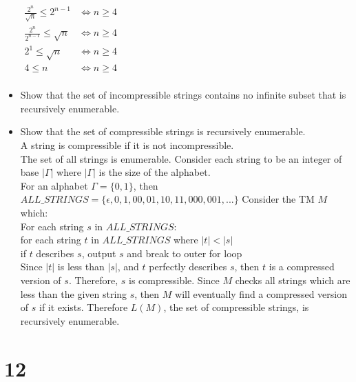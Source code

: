 \documentclass[letterpaper,notitlepage,twoside]{article}
\renewcommand{\iff}{\Leftrightarrow} %
\newcommand\tab[1][1cm]{\hspace*{#1}} %
\begin{document}
\begin{itemize}
$\begin{aligned}
\frac{2^n}{\sqrt{n}} \leq 2^{n - 1} &\iff n \geq 4 \\
\frac{2^n}{2^{n - 1}} \leq \sqrt{n} &\iff n \geq 4 \\
2^1 \leq \sqrt{n} &\iff n \geq 4 \\
4 \leq n &\iff n \geq 4 \\
\end{aligned}$

\item Show that the set of incompressible strings contains no infinite subset that is recursively enumerable.

\item Show that the set of compressible strings is recursively enumerable.\\
A string is compressible if it is not incompressible.\\
The set of all strings is enumerable. Consider each string to be an integer of base $|\Gamma|$ where $|\Gamma|$ is the size of the alphabet. \\
For an alphabet $\Gamma = \{0, 1\}$, then $ALL\_STRINGS = \{\epsilon, 0, 1, 00, 01, 10, 11, 000, 001,...\}$
Consider the TM $M$ which: \\
For each string $s$ in $ALL\_STRINGS$: \\
	\tab for each string $t$ in $ALL\_STRINGS$ where $|t| < |s|$ \\
		\tab\tab if $t$ describes $s$, output $s$ and break to outer for loop \\		
Since $|t|$ is less than $|s|$, and $t$ perfectly describes $s$, then $t$ is a compressed version of $s$. Therefore, $s$ is compressible. Since $M$ checks all strings which are less than the given string $s$, then $M$ will eventually find a compressed version of $s$ if it exists. Therefore $L(M)$, the set of compressible strings, is recursively enumerable.


\end{itemize}
\section*{12}
\end{document}

